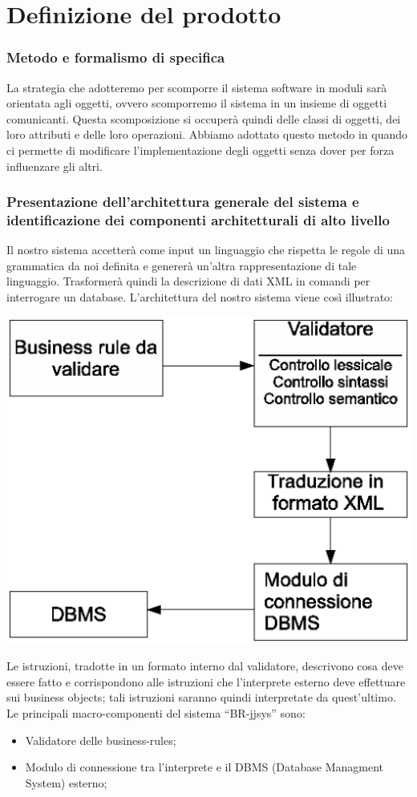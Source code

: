 \documentclass[11pt,titlepage,a4paper]{report}
\begin{document}
\chapter{Definizione del prodotto}
\subsection{Metodo e formalismo di specifica}
La strategia che adotteremo per scomporre il sistema software in moduli sar\`a orientata agli oggetti, ovvero scomporremo il sistema in un insieme di oggetti comunicanti. Questa scomposizione si occuper\`a quindi delle classi di oggetti, dei loro attributi e delle loro operazioni. Abbiamo adottato questo metodo in quando ci permette di modificare l'implementazione degli oggetti senza dover per forza influenzare gli altri.
\subsection{Presentazione dell'architettura generale del sistema e identificazione dei componenti architetturali di alto livello}
Il nostro sistema accetter\`a come input un linguaggio che rispetta le regole di una grammatica da noi definita e generer\`a un'altra rappresentazione di tale linguaggio. Trasformer\`a quindi la descrizione di dati XML in comandi per interrogare un database. L'architettura del nostro sistema viene cos\`i illustrato:
\begin{center}
\includegraphics[width=1\textwidth]{st.eps}
\end{center}
Le istruzioni, tradotte in un formato interno dal validatore, descrivono cosa deve essere fatto e corrispondono alle istruzioni che l'interprete esterno deve effettuare sui business objects; tali istruzioni saranno quindi interpretate da quest'ultimo.
Le principali macro-componenti del sistema ``BR-jjsys'' sono:
\begin{itemize}
\item Validatore delle business-rules;
\item Modulo di connessione tra l'interprete e il DBMS (Database Managment System) esterno;
\end{itemize}
\end{document}
